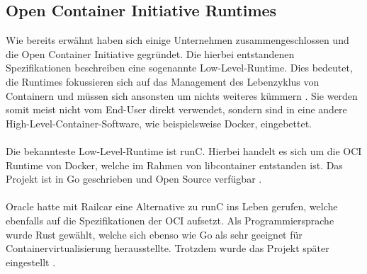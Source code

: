 \subsection{Open Container Initiative Runtimes}
Wie bereits erwähnt haben sich einige Unternehmen zusammengeschlossen und die Open Container Initiative gegründet. Die hierbei entstandenen Spezifikationen beschreiben eine sogenannte Low-Level-Runtime. Dies bedeutet, die Runtimes fokussieren sich auf das Management des Lebenzyklus von Containern und müssen sich ansonsten um nichts weiteres kümmern \cite{evan_baker_comprehensive_2021}. Sie werden somit meist nicht vom End-User direkt verwendet, sondern sind in eine andere High-Level-Container-Software, wie beispielsweise Docker, eingebettet.
\\\\
Die bekannteste Low-Level-Runtime ist runC. Hierbei handelt es sich um die OCI Runtime von Docker, welche im Rahmen von libcontainer entstanden ist. Das Projekt ist in Go geschrieben und Open Source verfügbar \cite{evan_baker_comprehensive_2021}.
\\\\
Oracle hatte mit Railcar eine Alternative zu runC ins Leben gerufen, welche ebenfalls auf die Spezifikationen der OCI aufsetzt. Als Programmiersprache wurde Rust gewählt, welche sich ebenso wie Go als sehr geeignet für Containervirtualisierung herausstellte. Trotzdem wurde das Projekt später eingestellt \cite{evan_baker_comprehensive_2021}.

